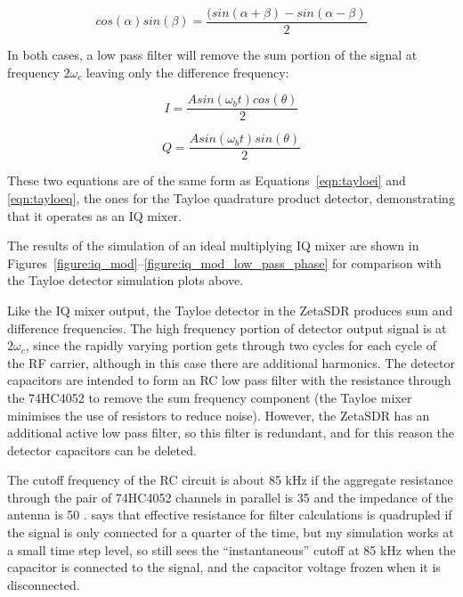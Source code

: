 \documentclass[11pt, twoside]{article}
\begin{document}
\begin{equation*}
  cos(\alpha)sin(\beta) = \frac{(sin(\alpha + \beta) - sin(\alpha - \beta)}{2} 
\end{equation*}

In both cases, a low pass filter will remove the sum portion of the
signal at frequency $2{\omega_c}$ leaving only the difference
frequency:

\begin{equation*}
  I = \frac{A sin({\omega_b}t)cos(\theta)}{2}
\end{equation*}

\begin{equation*}
  Q = \frac{A sin({\omega_b}t)sin(\theta)}{2}
\end{equation*}

These two equations are of the same form as
Equations~\ref{eqn:tayloei} and \ref{eqn:tayloeq}, the ones for the
Tayloe quadrature product detector, demonstrating that it operates as
an IQ mixer.

The results of the simulation of an ideal multiplying IQ mixer are
shown in
Figures~\ref{figure:iq_mod}--\ref{figure:iq_mod_low_pass_phase} for
comparison with the Tayloe detector simulation plots above.

Like the IQ mixer output, the Tayloe detector in the ZetaSDR produces
sum and difference frequencies. The high frequency portion of detector
output signal is at $2\omega_c$, since the rapidly varying portion
gets through two cycles for each cycle of the RF carrier, although in
this case there are additional harmonics.  The detector capacitors are
intended to form an RC low pass filter with the resistance through the
74HC4052 to remove the sum frequency component (the Tayloe mixer
minimises the use of resistors to reduce noise).  However, the ZetaSDR
has an additional active low pass filter, so this filter is redundant,
and for this reason the detector capacitors can be deleted.

The cutoff frequency of the RC circuit is about 85 kHz if the
aggregate resistance through the pair of 74HC4052 channels in parallel
is 35 {\ohm} and the impedance of the antenna is 50 {\ohm}.
\cite{Tayloe:2013} says that effective resistance for filter
calculations is quadrupled if the signal is only connected for a
quarter of the time, but my simulation works at a small time step
level, so still sees the ``instantaneous'' cutoff at 85 kHz when the
capacitor is connected to the signal, and the capacitor voltage frozen
when it is disconnected.
\end{document}

